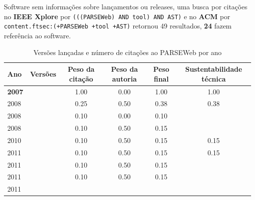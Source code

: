 Software sem informações sobre lançamentos ou releases,
uma busca por citações no {\bf IEEE Xplore} por
\texttt{(((PARSEWeb) AND tool) AND AST)}
e no {\bf ACM} por
\texttt{content.ftsec:(+PARSEWeb +tool +AST)}
retornou
49 resultados,
{\bf 24} fazem referência ao software.


\begin{table}[H]
\caption{Versões lançadas e número de citações ao PARSEWeb por ano}
\centering
\begin{tabular}{| l | c | c | c | c | c |}
  \hline
  Ano & Versões & Peso da citação & Peso da autoria & Peso final & Sustentabilidade técnica \\
  \hline
            {\bf 2007}
          &
          
          &
          1.00
          &
          0.00
          &
          1.00
          &
            {\color{blue} 1.00}
          \\
\hline
            2008
          &
          
          &
          0.25
          &
          0.50
          &
          0.38
          &
            {\color{red} 0.38}
          \\
            2008
          &
          
          &
          0.10
          &
          0.00
          &
          0.10
          &
          \\
            2008
          &
          
          &
          0.10
          &
          0.50
          &
          0.15
          &
          \\
\hline
            2010
          &
          
          &
          0.10
          &
          0.50
          &
          0.15
          &
            {\color{red} 0.15}
          \\
\hline
            2011
          &
          
          &
          0.10
          &
          0.50
          &
          0.15
          &
            {\color{red} 0.15}
          \\
            2011
          &
          
          &
          0.10
          &
          0.50
          &
          0.15
          &
          \\
            2011
          &
          
          &
          0.10
          &
          0.50
          &
          0.15
          &
          \\
            2011
          &
          

\end{tabular}
\end{table}
